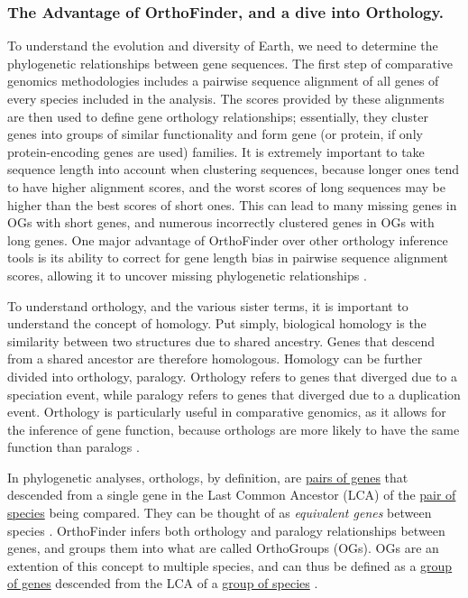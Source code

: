 \subsubsection*{The Advantage of OrthoFinder, and a dive into Orthology.}
To understand the evolution and diversity of Earth, we need to determine the phylogenetic relationships between gene sequences. The first step of comparative genomics methodologies includes a pairwise sequence alignment of all genes of every species included in the analysis. The scores provided by these alignments are then used to define gene orthology relationships; essentially, they cluster genes into groups of similar functionality and form gene (or protein, if only protein-encoding genes are used) families. It is extremely important to take sequence length into account when clustering sequences, because longer ones tend to have higher alignment scores, and the worst scores of long sequences may be higher than the best scores of short ones. This can lead to many missing genes in OGs with short genes, and numerous incorrectly clustered genes in OGs with long genes. One major advantage of OrthoFinder over other orthology inference tools is its ability to correct for gene length bias in pairwise sequence alignment scores, allowing it to uncover missing phylogenetic relationships \cite{emms2015, emms2019}.

To understand orthology, and the various sister terms, it is important to understand the concept of homology. Put simply, biological homology is the similarity between two structures due to shared ancestry. Genes that descend from a shared ancestor are therefore homologous. Homology can be further divided into orthology, paralogy. Orthology refers to genes that diverged due to a speciation event, while paralogy refers to genes that diverged due to a duplication event. Orthology is particularly useful in comparative genomics, as it allows for the inference of gene function, because orthologs are more likely to have the same function than paralogs \cite{gabaldon2013a}. 

In phylogenetic analyses, orthologs, by definition, are \underline{pairs of genes} that descended from a single gene in the Last Common Ancestor (LCA) of the \underline{pair of species} being compared. They can be thought of as \textit{equivalent genes} between species \cite{emms2015}. OrthoFinder infers both orthology and paralogy relationships between genes, and groups them into what are called OrthoGroups (OGs). OGs are an extention of this concept to multiple species, and can thus be defined as a \underline{group of genes} descended from the LCA of a \underline{group of species} \cite{emms2015, emms2019}. 

